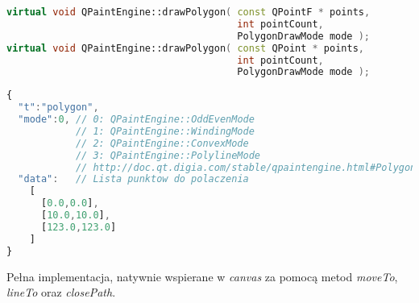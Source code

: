 \begin{lstlisting}[language=C++,numbers=none]
virtual void QPaintEngine::drawPolygon( const QPointF * points, 
                                        int pointCount, 
                                        PolygonDrawMode mode );
virtual void QPaintEngine::drawPolygon( const QPoint * points, 
                                        int pointCount, 
                                        PolygonDrawMode mode );
\end{lstlisting}
\begin{lstlisting}[language=JavaScript,numbers=none]
{
  "t":"polygon",
  "mode":0, // 0: QPaintEngine::OddEvenMode
            // 1: QPaintEngine::WindingMode
            // 2: QPaintEngine::ConvexMode
            // 3: QPaintEngine::PolylineMode	
            // http://doc.qt.digia.com/stable/qpaintengine.html#PolygonDrawMode-enum
  "data":   // Lista punktow do polaczenia
    [
      [0.0,0.0],
      [10.0,10.0],
      [123.0,123.0]
    ]
}
\end{lstlisting}

Pełna implementacja, natywnie wspierane w \emph{canvas} za pomocą metod \emph{moveTo}, \emph{lineTo} oraz \emph{closePath}.
